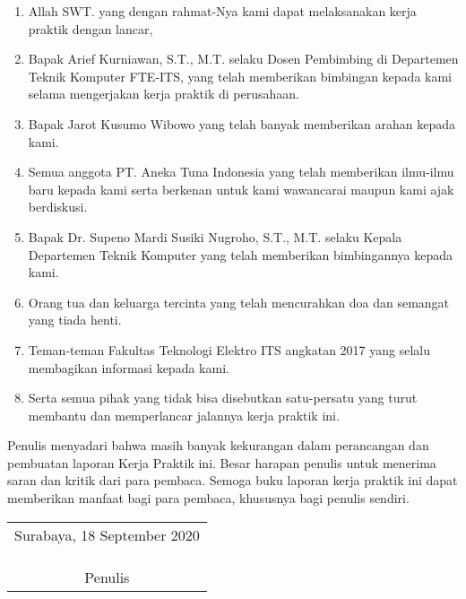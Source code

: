 \begin{enumerate}[nolistsep]

  \item Allah SWT. yang dengan rahmat-Nya kami dapat melaksanakan kerja praktik dengan lancar,
  \vspace{0.5ex}

  \item Bapak Arief Kurniawan, S.T., M.T. selaku Dosen Pembimbing di Departemen Teknik Komputer FTE-ITS, yang telah memberikan bimbingan kepada kami selama mengerjakan kerja praktik di perusahaan.
  \vspace{0.5ex}

  \item Bapak Jarot Kusumo Wibowo yang telah banyak memberikan arahan kepada kami.
  \vspace{0.5ex}

  \item Semua anggota PT. Aneka Tuna Indonesia yang telah memberikan ilmu-ilmu baru kepada kami serta berkenan untuk kami wawancarai maupun kami ajak berdiskusi.
  \vspace{0.5ex}

  \item Bapak  Dr. Supeno Mardi Susiki Nugroho, S.T., M.T. selaku Kepala Departemen Teknik Komputer yang telah memberikan bimbingannya kepada kami.
  \vspace{0.5ex}

  \item Orang tua dan keluarga tercinta yang telah mencurahkan doa dan semangat yang tiada henti.
  \vspace{0.5ex}

  \item Teman-teman Fakultas Teknologi Elektro ITS angkatan 2017 yang selalu membagikan informasi kepada kami.
  \vspace{0.5ex}

  \item Serta semua pihak yang tidak bisa disebutkan satu-persatu yang turut membantu dan memperlancar jalannya kerja praktik ini.
  \vspace{0.5ex}

\end{enumerate}
\vspace{0.5ex}

Penulis menyadari bahwa masih banyak kekurangan dalam perancangan dan pembuatan laporan Kerja Praktik ini.
Besar harapan penulis untuk menerima saran dan kritik dari para pembaca.
Semoga buku laporan kerja praktik ini dapat memberikan manfaat bagi para pembaca, khususnya bagi penulis sendiri.
\vspace{2ex}

\begin{flushright}
  \begin{tabular}[b]{c}
    Surabaya, 18 September 2020
    \\
    \\
    \\
    \\
    Penulis
  \end{tabular}
\end{flushright}